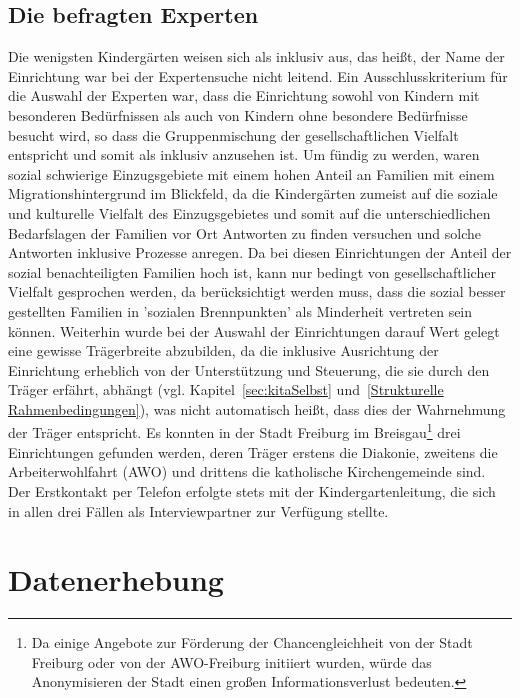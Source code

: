 \subsection{Die befragten Experten}
Die wenigsten Kindergärten weisen sich als inklusiv aus, das heißt, der Name der Einrichtung war bei der Expertensuche nicht leitend. Ein Ausschlusskriterium für die Auswahl der Experten war, dass die Einrichtung sowohl von Kindern mit besonderen Bedürfnissen als auch von Kindern ohne besondere Bedürfnisse besucht wird, so dass die Gruppenmischung der gesellschaftlichen Vielfalt entspricht und somit als inklusiv anzusehen ist. Um fündig zu werden, waren sozial schwierige Einzugsgebiete mit einem hohen Anteil an Familien mit einem Migrationshintergrund im Blickfeld, da die Kindergärten zumeist auf die soziale und kulturelle Vielfalt des Einzugsgebietes und somit auf die unterschiedlichen Bedarfslagen der Familien vor Ort Antworten zu finden versuchen und solche Antworten inklusive Prozesse anregen. Da bei diesen Einrichtungen der Anteil der sozial benachteiligten Familien hoch ist, kann nur bedingt von gesellschaftlicher Vielfalt gesprochen werden, da berücksichtigt werden muss, dass die sozial besser gestellten Familien in ’sozialen Brennpunkten’ als Minderheit vertreten sein können.    
Weiterhin wurde bei der Auswahl der Einrichtungen darauf Wert gelegt eine gewisse Trägerbreite abzubilden, da die inklusive Ausrichtung der Einrichtung erheblich von der Unterstützung und Steuerung, die sie durch den Träger erfährt, abhängt (vgl. Kapitel~\ref{sec:kitaSelbst} und~\ref{Strukturelle Rahmenbedingungen}), was nicht automatisch heißt, dass dies der Wahrnehmung der Träger entspricht. Es konnten in der Stadt Freiburg im Breisgau\footnote{Da einige Angebote zur Förderung der Chancengleichheit von der Stadt Freiburg oder von der AWO-Freiburg initiiert wurden, würde das Anonymisieren der Stadt einen großen Informationsverlust bedeuten.} drei Einrichtungen gefunden werden, deren Träger erstens die Diakonie, zweitens die Arbeiterwohlfahrt (AWO) und drittens die katholische Kirchengemeinde sind. Der Erstkontakt per Telefon erfolgte stets mit der Kindergartenleitung, die sich in allen drei Fällen als Interviewpartner zur Verfügung stellte. 

\section{Datenerhebung}
